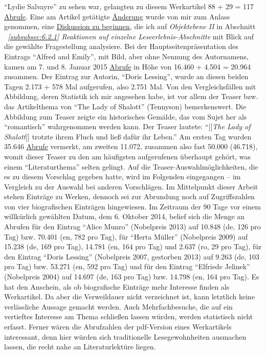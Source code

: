 \documentclass[fontsize=12pt]{scrartcl}
\begin{document}
"`Lydie Salvayre"' zu sehen war, gelangten zu diesem Werkartikel 88 + 29 = 117 \href{http://stats.grok.se/de/latest90/La_Vie_commune}{Abrufe}. Eine am Artikel get\"atigte \href{https://de.wikipedia.org/w/index.php?title=La_Vie_commune&diff=next&oldid=136619097}{\"Anderung} wurde von mir zum Anlass genommen, eine \href{https://de.wikipedia.org/w/index.php?title=Diskussion:La_Vie_commune&oldid=138030860#Meinung_einzelner}{Dis\-kus\-si\-on zu beginnen}, die ich auf \textit{Objektebene II} in Abschnitt \textit{~\ref{subsubsec:6.2.1} Reaktionen auf einzelne Leseerlebnis-Abschnitte} mit Blick auf die gew\"ahlte Fragestellung ana\-lysiere. Bei der Hauptsei\-tenpr\"asentation des Eintrags "`Alfred and Emily"', mit Bild, aber ohne Nennung des Autor\textsuperscript{\tiny *}namens, kamen am 7. und 8. Ja\-nuar 2015 \href{http://stats.grok.se/de/latest90/Alfred_und_Emily}{Abrufe} in H\"ohe von 16.460 + 4.504 = 20.964 zusammen. Der Eintrag zur Autorin\textsuperscript{\tiny *}, "`Doris Lessing"', wurde an diesen beiden Tagen 2.173 + 578 Mal aufgerufen, also 2.751 Mal. Von den Vergleichsf\"allen mit Abbildung, deren Statistik ich mir angesehen habe, ist vor allem der Teaser bzw. das Artikelthema von "`The Lady of Shalott"' (Tennyson) bemerkenswert. Die Abbildung zum Teaser zeigte ein historisches Gem\"alde, das vom Sujet her als "`roman\-tisch"' wahrgenommen werden kann. Der Teaser lautete: "`[[\textit{The Lady of Shalott}]] trotzte ihrem Fluch und lie{\ss} daf\"ur ihr Leben."' Am ersten Tag wurden 35.646 \href{http://stats.grok.se/de/latest90/The_Lady_of_Shalott}{Abrufe} vermerkt, am zwei\-ten 11.072, zusammen also fast 50.000 (46.718), womit dieser Teaser zu den am h\"aufigsten aufgerufenen \"uberhaupt geh\"ort, was einem "`Li\-te\-ra\-tur\-thema"' selten gelingt. Auf die Teaser-Auswahlm\"oglichkei\-ten, die es zu diesem Vorschlag gegeben hatte, wird im Folgenden eingegangen -- im Vergleich zu der Auswahl bei anderen Vorschl\"agen. Im Mittelpunkt dieser Arbeit stehen Eintr\"age zu Werken, dennoch sei zur Abrundung noch auf Zugriffszahlen von \mbox{vier} biografischen Eintr\"agen hingewiesen. Im Zeitraum der 90 Tage vor einem willk\"urlich gew\"ahlten Datum, dem 6. Oktober 2014, belief sich die Menge an Abrufen f\"ur den Eintrag "`Alice Munro"' (Nobelpreis 2013) auf 10.848 (de, 126 pro Tag) bzw. 70.401 (en, 782 pro Tag), f\"ur "`Herta M\"uller"' (Nobelpreis 2009) auf 15.238 (de, 169 pro Tag), 14.781 (en, 164 pro Tag) und 2.637 (ro, 29 pro Tag), f\"ur den Eintrag "`Doris Lessing"' (Nobelpreis 2007, gestorben 2013) auf 9.263 (de, 103 pro Tag) bzw. 53.271 (en, 592 pro Tag) und f\"ur den Eintrag "`Elfriede Jelinek"' (Nobelpreis 2004) auf 14.697 (de, 163 pro Tag) bzw. 14.798 (en, 164 pro Tag). Es hat den Anschein, als ob biografische Eintr\"age mehr Interesse finden als Werkartikel. Da aber die Verweildauer nicht verzeichnet ist, kann letzt\-lich keine verl\"assliche Aussage gemacht werden. Auch Mehrfachbesuche, die auf ein vertieftes Interesse am Thema schlie{\ss}en lassen w\"urden, werden statistisch nicht erfasst. Ferner w\"aren die Abrufzahlen der pdf-Version eines Werkartikels interessant, denn \mbox{hier} w\"urden sich traditionelle Lesegewohnhei\-ten ausmachen lassen, die recht nahe an Li\-te\-ra\-tur\-lekt\"ure liegen.
\end{document}
